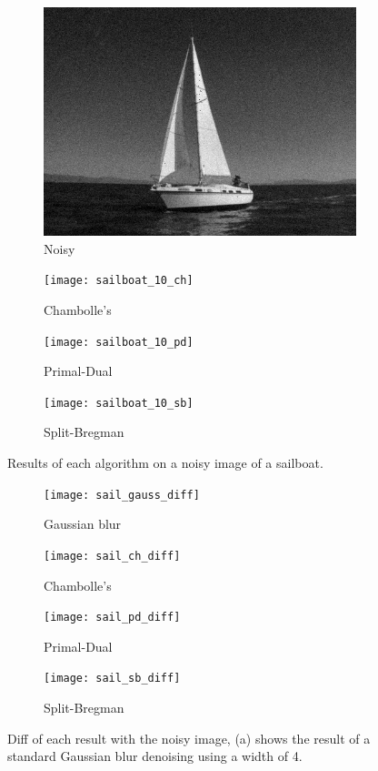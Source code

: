\documentclass[11pt]{article}
\begin{document}
\begin{figure}
\centering
\graphicspath{{images/}}
\begin{subfigure}[b]{0.4\textwidth}
\centering
\includegraphics[width=\textwidth]{sailboat_10}
\caption{Noisy}
\label{sail:noise}
\end{subfigure}
\begin{subfigure}[b]{0.4\textwidth}
\centering
\texttt{[image: sailboat\_10\_ch]}
\caption{Chambolle's}
\label{sail:ch}
\end{subfigure}
\begin{subfigure}[b]{0.4\textwidth}
\centering
\texttt{[image: sailboat\_10\_pd]}
\caption{Primal-Dual}
\label{sail:pd}
\end{subfigure}
\begin{subfigure}[b]{0.4\textwidth}
\centering
\texttt{[image: sailboat\_10\_sb]}
\caption{Split-Bregman}
\label{sail:sb}
\end{subfigure}
\caption{Results of each algorithm on a noisy image of a sailboat.}
\label{fig:sailboat:dn}
\end{figure}

\begin{figure}
\centering
\graphicspath{{images/}}
\begin{subfigure}[b]{0.4\textwidth}
\centering
\texttt{[image: sail\_gauss\_diff]}
\caption{Gaussian blur}
\label{sail:gauss:diff}
\end{subfigure}
\begin{subfigure}[b]{0.4\textwidth}
\centering
\texttt{[image: sail\_ch\_diff]}
\caption{Chambolle's}
\label{sail:ch:diff}
\end{subfigure}
\begin{subfigure}[b]{0.4\textwidth}
\centering
\texttt{[image: sail\_pd\_diff]}
\caption{Primal-Dual}
\label{sail:pd:diff}
\end{subfigure}
\begin{subfigure}[b]{0.4\textwidth}
\centering
\texttt{[image: sail\_sb\_diff]}
\caption{Split-Bregman}
\label{sail:sb:diff}
\end{subfigure}
\caption{Diff of each result with the noisy image, (a) shows the result of a standard Gaussian blur denoising using a width of 4.}
\label{fig:sailboat:diff}
\end{figure}
\end{document}
